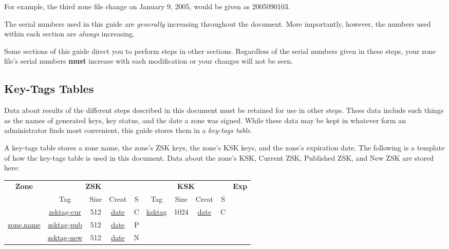 \documentclass[12pt]{article}
\begin{document}
For example, the third zone file change on January 9, 2005, would be given
as 2005090103.

The serial numbers used in this guide are {\it generally} increasing
throughout the document.  More importantly, however, the numbers used within
each section are {\it always} increasing.

Some sections of this guide direct you to perform steps in other sections.
Regardless of the serial numbers given in these steps, your zone file's serial
numbers {\bf must} increase with each modification or your changes will not
be seen.


\clearpage
\subsection{Key-Tags Tables}
\label{key-tags-tables}

Data about results of the different steps described in this document must be
retained for use in other steps.  These data include such things as the names
of generated keys, key status, and the date a zone was signed.  While these
data may be kept in whatever form an administrator finds most convenient,
this guide stores them in a {\it key-tags table}.

A key-tags table stores a zone name, the zone's ZSK keys, the zone's KSK keys,
and the zone's expiration date.  The following is a template of how the
key-tags table is used in this document.  Data about the zone's KSK, Current
ZSK, Published ZSK, and New ZSK are stored here:

\begin{center}
\begin{tabular}{|c|c|c|c|c|c|c|c|c|c|}
\hline
{\bf Zone} &
\multicolumn{4}{c|}{{\bf ZSK}} &
\multicolumn{4}{c|}{{\bf KSK}} &
{\bf Exp} \\
\cline{2-9}

 & Tag & Size & Creat & S & Tag & Size & Creat & S & \\
\hline

			&
\underline{zsktag-cur}	&
512			&
\underline{date}	&
C			&
\underline{ksktag}	&
1024			&
\underline{date}	&
C			& \\

\cline{2-9}

\underline{zone.name}	&
\underline{zsktag-pub}	&
512			&
\underline{date}	&
P			&
& & & & \\

			&
\underline{zsktag-new}	&
512			&
\underline{date}	&
N			&
& & & & \\

\hline
\end{tabular}
\end{center}
\end{document}
